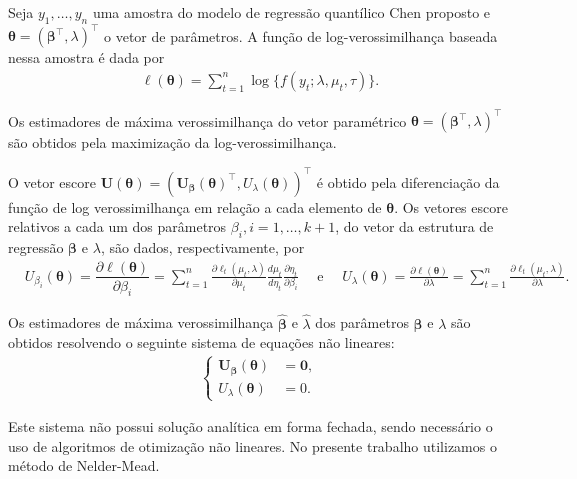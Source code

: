 \documentclass{sciposter}
\begin{document}
\begin{multicols*}{2}
{\vspace{0.2cm}

Seja $y_1, \ldots, y_n$ uma amostra do modelo de regressão quantílico Chen proposto e $\bm{\theta}=(\bm{\beta}^{\top}, \lambda)^{\top}$ o vetor de parâmetros. A função de log-verossimilhança baseada  nessa amostra  é dada por
\begin{align}\label{logvero}
\ell(\bm{\theta})=\sum\limits_{t=1}^{n}\log \{f(y_t; \lambda, \mu_t, \tau)\}.
\end{align}


Os estimadores de máxima verossimilhança do vetor paramétrico $\bm{\theta}= ( \bm{\beta}^{\top}, \lambda)^{\top}$ são obtidos pela maximização da log-verossimilhança. 



O vetor escore $\bm{U}(\bm{\theta})=(\bm{U}_{\bm{\beta}}(\bm{\theta})^\top , U_\lambda(\bm{\theta}))^\top $ é obtido pela diferenciação da função de log verossimilhança em relação a cada elemento de $\bm{\theta}$. Os vetores escore relativos a cada um dos parâmetros $\beta_i, i=1, \ldots, k+1$, do vetor da estrutura de regressão $\bm{\beta}$ e $\lambda$, são dados, respectivamente, por
\begin{align*}
& U_{\beta_i}(\bm{\theta})=\dfrac{\partial \ell(\bm{\theta})}{\partial\beta_i}= \sum\limits_{t=1}^{n}\frac{\partial \ell_t(\mu_t,\lambda)}{\partial\mu_t}\frac{d\mu_t}{d \eta_t}\frac{\partial\eta_t}{\partial\beta_i} \quad 
\mbox{ e } \quad U_\lambda(\bm{\bm{\theta}})=\frac{\partial \ell(\bm{\theta})}{\partial\lambda}= \sum\limits_{t=1}^{n}\frac{\partial \ell_t(\mu_t,\lambda)}{\partial\lambda}.
\end{align*}



Os estimadores de máxima verossimilhança $\widehat{\bm{\beta}}$ e $\widehat{\lambda}$ dos parâmetros  $\bm{\beta}$ e $\lambda$ são obtidos resolvendo o seguinte sistema de equações não lineares:
\begin{align}\label{system}
\left\{ \begin{array}{ll} \bm{U}_{\bm{\beta}}(\bm{\theta})&=\bm{0} ,\\
U_\lambda(\bm{\theta})&= 0 .\end{array} \right.
\end{align}

Este sistema  não possui solução analítica em forma fechada, sendo necessário o uso de algoritmos de otimização não lineares. No presente trabalho utilizamos o método de Nelder-Mead. 


}
\end{multicols*}
\end{document}
